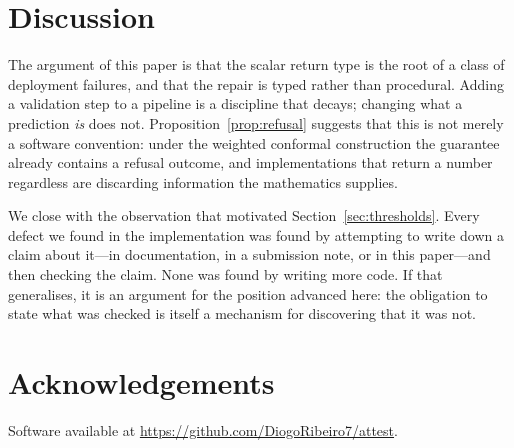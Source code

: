 \documentclass[11pt,a4paper]{article}
\theoremstyle{definition}
\begin{document}
\section{Discussion}

The argument of this paper is that the scalar return type is the root of a
class of deployment failures, and that the repair is typed rather than
procedural. Adding a validation step to a pipeline is a discipline that decays;
changing what a prediction \emph{is} does not. Proposition~\ref{prop:refusal}
suggests that this is not merely a software convention: under the weighted
conformal construction the guarantee already contains a refusal outcome, and
implementations that return a number regardless are discarding information the
mathematics supplies.

We close with the observation that motivated Section~\ref{sec:thresholds}. Every defect we found
in the implementation was found by attempting to write down a claim about
it---in documentation, in a submission note, or in this paper---and then
checking the claim. None was found by writing more code. If that generalises,
it is an argument for the position advanced here: the obligation to state what
was checked is itself a mechanism for discovering that it was not.

\section*{Acknowledgements}

Software available at \url{https://github.com/DiogoRibeiro7/attest}.



\end{document}
